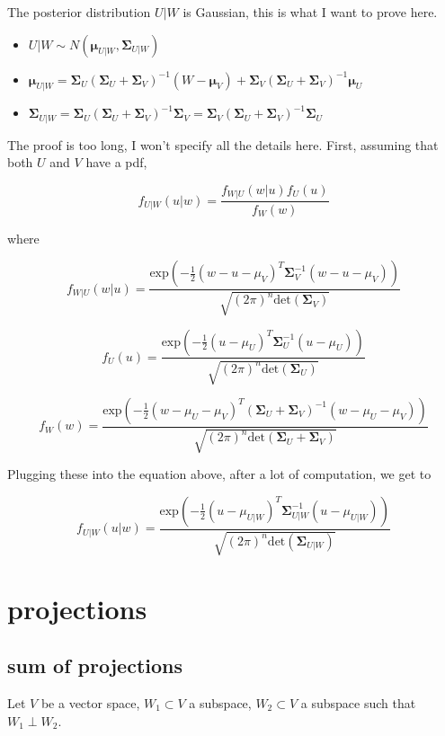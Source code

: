\documentclass{article}
\begin{document}
\begin{appendices}
The posterior distribution $U|W$ is Gaussian, this is what I want to prove here.

\begin{itemize}
    \item $U|W \sim N(\bm{\mu}_{U|W}, \bm{\Sigma}_{U|W})$
    \item $\bm{\mu}_{U|W} = \bm{\Sigma}_U (\bm{\Sigma}_U + \bm{\Sigma}_V)^{-1} (W - \bm{\mu}_V) + \bm{\Sigma}_V (\bm{\Sigma}_U + \bm{\Sigma}_V)^{-1}\bm{\mu}_U$
    \item $\bm{\Sigma}_{U|W} = \bm{\Sigma}_U (\bm{\Sigma}_U + \bm{\Sigma}_V)^{-1} \bm{\Sigma}_V = \bm{\Sigma}_V (\bm{\Sigma}_U + \bm{\Sigma}_V)^{-1} \bm{\Sigma}_U$
\end{itemize}

The proof is too long, I won't specify all the details here. First, assuming that both $U$ and $V$ have a pdf,

\[
f_{U|W}(u|w) = \frac{f_{W|U}(w|u) f_{U}(u)}{f_{W}(w)}
\]

where

\[
f_{W|U}(w|u) = \frac{\text{exp}\left(-\frac12 (w-u-\mu_V)^T \bm{\Sigma}_V^{-1} (w-u-\mu_V) \right)}{\sqrt{(2\pi)^n \text{det}(\bm{\Sigma}_V)}}
\]

\[
f_{U}(u) = \frac{\text{exp}\left( -\frac12 (u-\mu_U)^T \bm{\Sigma}^{-1}_U (u-\mu_U) \right)}{\sqrt{(2\pi)^n \text{det}(\bm{\Sigma}_U)}}
\]

\[
f_{W}(w) = \frac{\text{exp}\left( -\frac12 (w-\mu_U-\mu_V)^T (\bm{\Sigma}_U + \bm{\Sigma}_V)^{-1} (w-\mu_U-\mu_V) \right)}{\sqrt{(2\pi)^n \text{det}(\bm{\Sigma}_U + \bm{\Sigma}_V)}}
\]

Plugging these into the equation above, after a lot of computation, we get to

\[
f_{U|W}(u|w) = \frac{\text{exp}\left( -\frac12 (u-\mu_{U|W})^T \bm{\Sigma}_{U|W}^{-1} (u-\mu_{U|W}) \right)}{\sqrt{(2\pi)^n \text{det}(\bm{\Sigma}_{U|W})}}
\]


\section{projections}

\subsection{sum of projections}

Let $V$ be a vector space, $W_1 \subset V$ a subspace, $W_2 \subset V$ a subspace such that $W_1 \perp W_2$.


\end{appendices}
\end{document}
